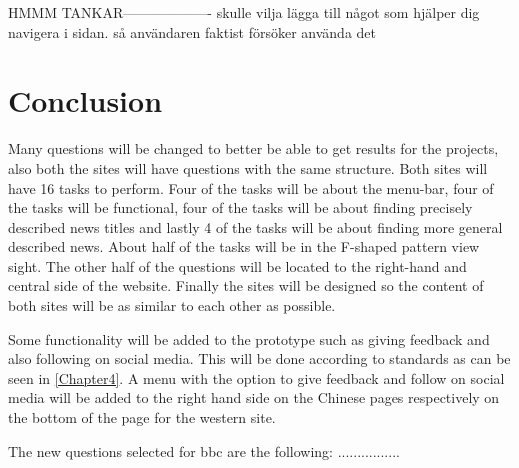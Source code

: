 HMMM TANKAR-------------------
skulle vilja lägga till något som hjälper dig navigera i sidan. så användaren faktist försöker använda det
\section{Conclusion}
Many questions will be changed to better be able to get results for the projects, also both the sites will have questions with the same structure. Both sites will have 16 tasks to perform. Four of the tasks will be about the menu-bar, four of the tasks will be functional, four of the tasks will be about finding precisely described news titles and lastly 4 of the tasks will be about finding more general described news. About half of the tasks will be in the F-shaped pattern view sight. The other half of the questions will be located to the right-hand and central side of the website. Finally the sites will be designed so the content of both sites will be as similar to each other as possible. 

Some functionality will be added to the prototype such as giving feedback and also following on social media. This will be done according to standards as can be seen in \ref{Chapter4}. A menu with the option to give feedback and follow on social media will be added to the right hand side on the Chinese pages respectively on the bottom of the page for the western site.

The new questions selected for bbc are the following:
................

